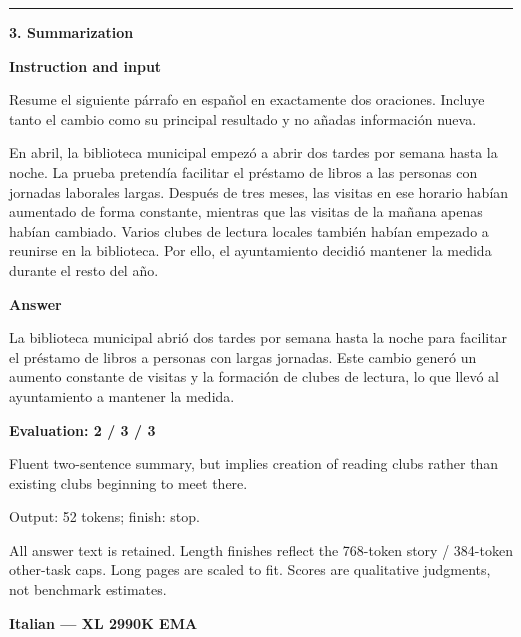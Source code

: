 \documentclass[10pt]{article}
\begin{document}
{\begin{minipage}{\textwidth}
\medskip\hrule\smallskip
{\bfseries 3. Summarization}\par\smallskip
\textbf{Instruction and input}\par Resume el siguiente párrafo en español en exactamente dos oraciones. Incluye tanto el cambio como su principal resultado y no añadas información nueva.
\par\smallskip
En abril, la biblioteca municipal empezó a abrir dos tardes por semana hasta la noche. La prueba pretendía facilitar el préstamo de libros a las personas con jornadas laborales largas. Después de tres meses, las visitas en ese horario habían aumentado de forma constante, mientras que las visitas de la mañana apenas habían cambiado. Varios clubes de lectura locales también habían empezado a reunirse en la biblioteca. Por ello, el ayuntamiento decidió mantener la medida durante el resto del año.\par\smallskip
\textbf{Answer}\par La biblioteca municipal abrió dos tardes por semana hasta la noche para facilitar el préstamo de libros a personas con largas jornadas. Este cambio generó un aumento constante de visitas y la formación de clubes de lectura, lo que llevó al ayuntamiento a mantener la medida.\par\smallskip
\textbf{Evaluation: 2 / 3 / 3}\par Fluent two-sentence summary, but implies creation of reading clubs rather than existing clubs beginning to meet there.
\par {\color{gray} Output: 52 tokens; finish: stop.}\par
\medskip\footnotesize All answer text is retained. Length finishes reflect the 768-token story / 384-token other-task caps. Long pages are scaled to fit. Scores are qualitative judgments, not benchmark estimates.
\end{minipage}}%
\noindent\ifdim\dimexpr\ht\languagepage+\dp\languagepage\relax>0.93\textheight%
\resizebox*{!}{0.93\textheight}{\usebox{\languagepage}}%
\else\usebox{\languagepage}\fi%
\clearpage
{\Large\bfseries Italian --- XL 2990K EMA}\par\smallskip
\end{document}
